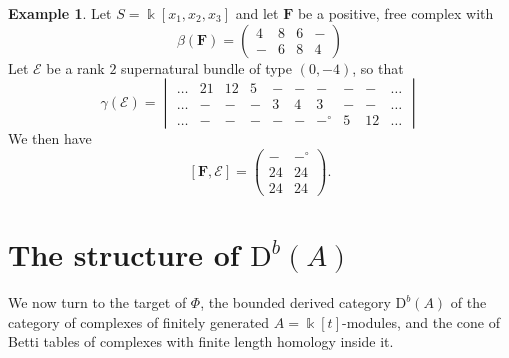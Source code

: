 \documentclass[12pt]{amsart}
\theoremstyle{definition}
\newtheorem{example}[lemma]{Example}
\theoremstyle{remark}
\newcommand{\kk}{\Bbbk}
\newcommand{\PP}{\mathbb{P}}
\newcommand{\cO}{\mathcal{O}}
\newcommand{\cE}{\mathcal{E}}
\newcommand{\cF}{\mathcal{F}}
\newcommand{\FF}{\mathbf{F}}
\newcommand{\DD}{\mathrm{D}}
\begin{document}
\begin{example}
Let $S=\kk[x_1,x_2, x_3]$ and let $\FF$ be a positive, free complex with
\[
\beta(\FF)=\begin{pmatrix} 4&8&6&-\\-&6&8&4\end{pmatrix}
\]
Let $\cE$ be a rank $2$ supernatural bundle of type $(0,-4)$, so that
\[
\gamma(\cE)=
\begin{vmatrix}
\dots&21&12&5&-&-&-&-&-&\dots\\
\dots&-&-&-&3&4&3&-&-&\dots\\
\dots&-&-&-&-&-&-^\circ&5&12&\dots
\end{vmatrix}
\]
We then have
\[
[\FF, \cE]=
\begin{pmatrix}
-&-^\circ\\
24&24\\
24&24
\end{pmatrix}.
\]
\end{example}

\section{The structure of $\DD^b(A)$}\label{sec:DbA}
We now turn to the target of $\Phi$, the bounded derived category $\DD^b(A)$ of the category of 
complexes of finitely generated $A = \kk[t]$-modules, and the cone of Betti tables of complexes
with finite length homology inside it.
\end{document}
